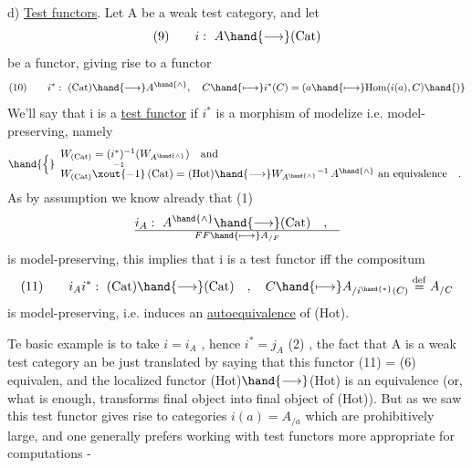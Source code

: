 d) \uline{Test functors}. Let A be a weak test category, and let
\[ (9) \qquad i:\ A \hand{\longrightarrow} (\mathrm{Cat}) \]
be a functor, giving rise to a functor
\[ (10) \qquad i^{*} :\ (\mathrm{Cat}) \hand{\longrightarrow} A^{\hand{\wedge}} , \quad C \hand{\longmapsto} i^{*}(C) = (a \hand{\longmapsto} \mathrm{Hom}(i(a),C)\hand{)} \]
We'll say that i is a  \uline{test functor} if $i^{*}$ is  a morphism of modelize
i.e. model-preserving, namely
\[ \hand{\Big\{}\begin{array}{l} W_{(\mathrm{Cat})} = (i^{*})^{-1}(W_{A^{\hand{\wedge}}}) \quad \text{and} \\ W_{(\mathrm{Cat})}\overset{-1}{\xout{-1}}\,(\mathrm{Cat}) = (\mathrm{Hot}) \hand{\longrightarrow} W_{A^{\hand{\wedge}}}{}^{-1}\,A^{\hand{\wedge}} \text{ an equivalence} \quad . \end{array} \]
As by assumption we know already that (1)
\[ i_{A} :\ A^{\hand{\wedge}} \hand{\longrightarrow} (\mathrm{Cat}) \quad , \quad \over{F}{F} \hand{\longmapsto} A_{/F} \]
is model-preserving, this implies that i is a  test functor iff the
compositum
\[ (11) \qquad i_{A}i^{*} :\ (\mathrm{Cat}) \hand{\longrightarrow} (\mathrm{Cat}) \quad , \quad C \hand{\longmapsto} A_{/i^{\hand{*}}(C)} \overset{\mathrm{def}}{=} A_{/C} \]
is model-preserving, i.e.  induces an \uline{autoequivalence} of (Hot).

Te basic example is to take $i = i_{A}$ , hence $i^{*} = j_{A}$ (2) , the
 fact that A is a weak test category an be just translated  by saying
that this functor (11) = (6)   
equivalen,  and the localized functor (Hot)$\hand{\longrightarrow}$(Hot) is an
equivalence (or, what is enough, transforms final object into final
object of (Hot)). But as we saw \hand{,} this  test functor gives rise to
categories $i(a) = A_{/a}$ which are prohibitively large, and one generally
prefers working with  test functors more appropriate for computations -

